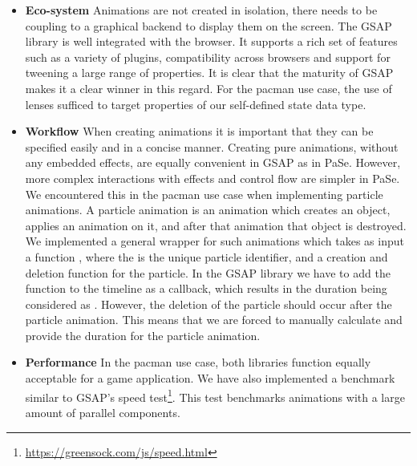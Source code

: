 \begin{itemize}
\item \textbf{Eco-system} Animations are not created in isolation, there needs to be coupling to a graphical backend to display them on the screen. The GSAP library is well integrated with the browser. It supports a rich set of features such as a variety of plugins, compatibility across browsers and support for tweening a large range of properties. It is clear that the maturity of GSAP makes it a clear winner in this regard. For the pacman use case, the use of lenses sufficed to target properties of our self-defined state data type.
\item \textbf{Workflow} When creating animations it is important that they can be specified easily and in a concise manner. Creating pure animations, without any embedded effects, are equally convenient in GSAP as in PaSe. However, more complex interactions with effects and control flow are simpler in PaSe. We encountered this in the pacman use case when implementing particle animations. A particle animation is an animation which creates an object, applies an animation on it, and after that animation that object is destroyed. We implemented a general wrapper for such animations which takes as input a function , where the  is the unique particle identifier, and a creation and deletion function for the particle. In the GSAP library we have to add the function to the timeline as a callback, which results in the duration being considered as . However, the deletion of the particle should occur after the particle animation. This means that we are forced to manually calculate and provide the duration for the particle animation.
\item \textbf{Performance} In the pacman use case, both libraries function equally acceptable for a game application. We have also implemented a benchmark similar to GSAP's speed test\footnote{\url{https://greensock.com/js/speed.html}}. This test benchmarks animations with a large amount of parallel components.
\end{itemize}
